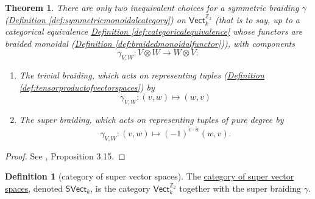 \documentclass[a4paper]{report}
\newcommand{\Z}{\mathbb{Z}}
\newcommand{\defn}[1]{\ul{#1}}
\theoremstyle{definition}
\newtheorem{definition}{Definition}[section]
\theoremstyle{plain}
\newtheorem{theorem}{Theorem}[section]
\theoremstyle{remark}
\begin{document}
\begin{theorem}
  There are only two inequivalent choices for a symmetric braiding $\gamma$ (\hyperref[def:symmetricmonoidalcategory]{Definition \ref*{def:symmetricmonoidalcategory}}) on $\mathsf{Vect}_{k}^{\Z_{2}}$ (that is to say, up to a categorical equivalence \hyperref[def:categoricalequivalence]{Definition \ref*{def:categoricalequivalence}} whose functors are braided monoidal (\hyperref[def:braidedmonoidalfunctor]{Definition \ref*{def:braidedmonoidalfunctor}})),  with components
  \begin{equation*}
    \gamma_{V,W}\colon V \otimes W \to W \otimes V:
  \end{equation*}

  \begin{enumerate}
    \item The \emph{trivial braiding}, which acts on representing tuples (\hyperref[def:tensorproductofvectorspaces]{Definition \ref*{def:tensorproductofvectorspaces}}) by 
      \begin{equation*}
        \gamma_{V, W}\colon (v, w) \mapsto (w, v)
      \end{equation*}

    \item The \emph{super braiding}, which acts on representing tuples of pure degree by
      \begin{equation*}
        \gamma_{V, W}\colon (v, w) \mapsto (-1)^{\tilde{v}\cdot \tilde{w}}(w, v).
      \end{equation*}
  \end{enumerate}
\end{theorem}

\begin{proof}
  See \cite{nlab-deligne-theorem}, Proposition 3.15.
\end{proof}

\begin{definition}[category of super vector spaces]
  \label{def:categoryofsupervectorspaces}
  The \defn{category of super vector spaces}, denoted $\mathsf{SVect}_{k}$, is the category $\mathsf{Vect}_{k}^{\Z_{2}}$ together with the super braiding $\gamma$.
\end{definition}
\end{document}
